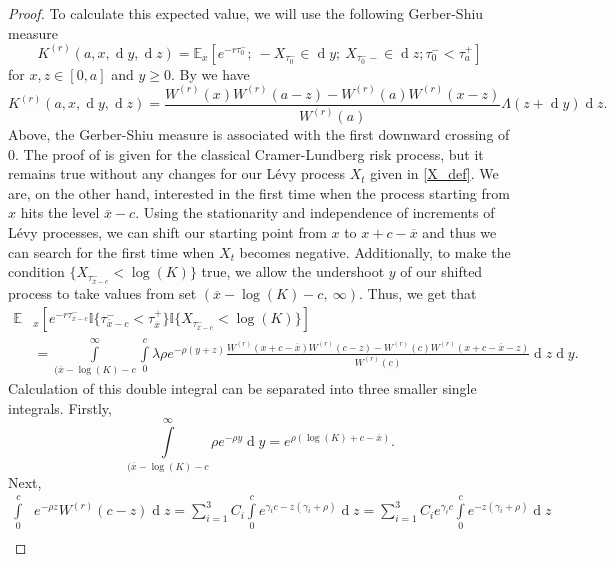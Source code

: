 \documentclass[10pt,a4paper]{amsart}
\def\E{{\mathbb{E}}}
\def \R{{{\rm I{\!}\rm R}}}
\def \I{{\mathbb{I}}}
\newcommand{\dx}{\operatorname{d}\!}
\def\E{{\mathbb E}} \def\PP{\mc P} \def\Z{{\mathbb Z}} \def\R{{\mathbb R}}
\begin{document}
\begin{proof}
			To calculate this expected value, we will use the following Gerber-Shiu measure
			\begin{equation*}
				K^{(r)}(a,x,\dx y, \dx z) =	\E_x \left[ e^{-r\tau_0^-} ;\ -X_{\tau_0^-} \in \dx y;\ X_{\tau_0^- -} \in \dx z; \tau_0^- < \tau_a^+ \right]
			\end{equation*}
			for $x,z \in [0,a]$ and $y \geq 0$. By \cite[Thm. 5.5]{kyprianou} we have
			\begin{equation*}
				K^{(r)}(a,x,\dx y, \dx z) = \frac{W^{(r)}(x)W^{(r)}(a-z) - W^{(r)}(a)W^{(r)}(x-z)}{W^{(r)}(a)}\Lambda(z + \dx y)\dx z.
			\end{equation*}
			Above, the Gerber-Shiu measure is associated with the first downward crossing of $0$.
			The proof of \cite[Thm. 5.5]{kyprianou} is given for the classical Cramer-Lundberg risk process, but it remains true without any changes for our L\'evy process
			$X_t$ given in \eqref{X_def}.
			We are, on the other hand, interested in the first time when the process starting from $x$ hits the level $\overline{x}-c$. Using the stationarity and independence of increments of L\'evy processes, we can shift our starting point from $x$ to $x+c-\overline{x}$ and thus we can search for the first time when $X_t$ becomes negative. Additionally, to make the condition $\{ X_{\tau_{\overline{x}-c}^- } < \log(K)\}$ true, we allow the undershoot $y$ of our shifted process to take values from set $(\overline{x}-\log(K)-c,\ \infty)$. Thus, we get that
			\begin{align*}
				\E&_x \left[ e^{-r\tau_{\overline{x}-c}^- }
				\I \{ \tau_{\overline{x}-c}^- < \tau_{\overline{x}}^+ \}
				\I \{ X_{\tau_{\overline{x}-c}^- } < \log(K)\}
				\right] \\
				\nonumber&=\! \int\limits_{(\overline{x}-\log(K)-c}^{\infty} \int\limits_{0}^{c}  \lambda \rho e^{-\rho (y+z)} \frac{W^{(r)}(x+c-\overline{x})W^{(r)}(c-z) - W^{(r)}(c)W^{(r)}(x+c-\overline{x}-z)}{W^{(r)}(c)}\dx z \dx y.
			\end{align*}
			Calculation of this double integral can be separated into three smaller single integrals. Firstly,
			\begin{equation*}
				\int\limits_{(\overline{x}-\log(K)-c}^{\infty} \rho e^{-\rho y} \dx y = e^{\rho (\log(K)+c - \overline{x})}.
			\end{equation*}
			Next,
			\begin{align*}
				\int\limits_{0}^{c}& e^{-\rho z} W^{(r)}(c-z) \dx z = \sum_{i=1}^3 C_i \int\limits_{0}^{c} e^{\gamma_i c - z(\gamma_i + \rho)} \dx z = \sum_{i=1}^3 C_i e^{\gamma_i c} \int\limits_{0}^{c} e^{ - z(\gamma_i + \rho)} \dx z \\

\end{align*}
\end{proof}
\end{document}
